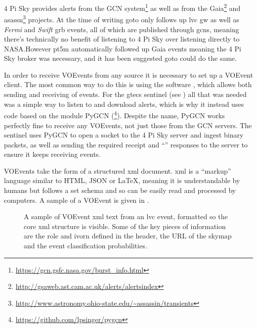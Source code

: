 \begin{colsection}
\begin{colsection}
4 Pi Sky provides alerts from the GCN system\footnote{\url{https://gcn.gsfc.nasa.gov/burst_info.html}} as well as from the Gaia\footnote{\url{http://gsaweb.ast.cam.ac.uk/alerts/alertsindex}} and \gls{asassn}\footnote{\url{http://www.astronomy.ohio-state.edu/~assassin/transients}} projects. At the time of writing \gls{goto} only follows up \gls{lvc} \gls{gw} as well as \textit{Fermi} and \textit{Swift} \gls{grb} events, all of which are published through \glspl{gcn}, meaning there's technically no benefit of listening to 4 Pi Sky over listening directly to NASA.\@ However pt5m automatically followed up Gaia events meaning the 4 Pi Sky broker was necessary, and it has been suggested \gls{goto} could do the same.

In order to receive VOEvents from any source it is necessary to set up a VOEvent client. The most common way to do this is using the  software \citep{comet}, which allows both sending and receiving of events. For the \gls{gtecs} sentinel (see ) all that was needed was a simple way to listen to and download alerts, which is why it instead uses code based on the  module PyGCN (\footnote{\url{https://github.com/lpsinger/pygcn}}). Despite the name, PyGCN works perfectly fine to receive any VOEvents, not just those from the GCN servers. The sentinel uses PyGCN to open a socket to the 4 Pi Sky server and ingest binary packets, as well as sending the required receipt and ``'' responses to the server to ensure it keeps receiving events.

VOEvents take the form of a structured \gls{xml} document. \gls{xml} is a ``markup'' language similar to HTML, JSON or \LaTeX, meaning it is understandable by humans but follows a set schema and so can be easily read and processed by computers. A sample of a VOEvent is given in .

\begin{figure}[p]
    
    \caption[VOEvent XML sample]{
        A sample of VOEvent \gls{xml} text from an \gls{lvc} event, formatted so the core \gls{xml} structure is visible. Some of the key pieces of information are the role and \gls{ivorn} defined in the header, the URL of the skymap and the event classification probabilities.
    }\label{fig:voevent_xml}
\end{figure}

\newpage

\end{colsection}


\end{colsection}


